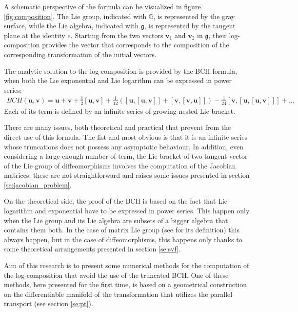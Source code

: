 A schematic perspective of the formula can be visualized in figure \ref{fig:composition}. The Lie group, indicated with $\mathbb{G}$, is represented by the gray surface, while the Lie algebra, indicated with $\mathfrak{g}$, is represented by the tangent plane at the identity $e$.
Starting from the two vectors $\mathbf{v}_1$ and $\mathbf{v}_2$ in $\mathfrak{g}$, their log-composition provides the vector that corresponds to the composition of the corresponding transformation of the initial vectors. 

% 
The analytic solution to the log-composition is provided by the BCH formula, when both the Lie exponential and Lie logarithm can be expressed in power series:
\begin{align*}
BCH(\mathbf{u},\mathbf{v}) 
= 
\mathbf{u} + \mathbf{v} + \frac{1}{2}[\mathbf{u},\mathbf{v}] + \frac{1}{12}([\mathbf{u},[\mathbf{u},\mathbf{v}]]
+ [\mathbf{v},[\mathbf{v},\mathbf{u}]]) - \frac{1}{24}[\mathbf{v},[\mathbf{u},[\mathbf{u},\mathbf{v}]]] +... 
\end{align*}
Each of its term is defined by an infinite series of growing nested Lie bracket.

%
There are many issues, both theoretical and practical that prevent from the direct use of this formula. The fist and most obvious is that it is an infinite series whose truncations does not possess any asymptotic behaviour.
In addition, even considering a large enough number of term, the Lie bracket of two tangent vector of the Lie group of diffeomorphisms involves the computation of the Jacobian matrices: these are not straightforward and raises some issues presented in section \ref{se:jacobian_problem}.

On the theoretical side, the proof of the BCH is based on the fact that Lie logarithm and exponential have to be expressed in power series. This happen only when the Lie group and its Lie algebra are subsets of a bigger algebra that contains them both. In the case of matrix Lie group (see \cite{hall2015lie} for its definition) this always happen, but in the case of diffeomorphisms, this happens only thanks to some theoretical arrangements presented in section \ref{se:svf}.
 
Aim of this research is to present some numerical methods for the computation of the log-composition that avoid the use of the truncated BCH. One of these methods, here presented for the first time, is based on a geometrical construction on the differentiable manifold of the transformation that utilizes the parallel transport (see section \ref{se:pt}).

